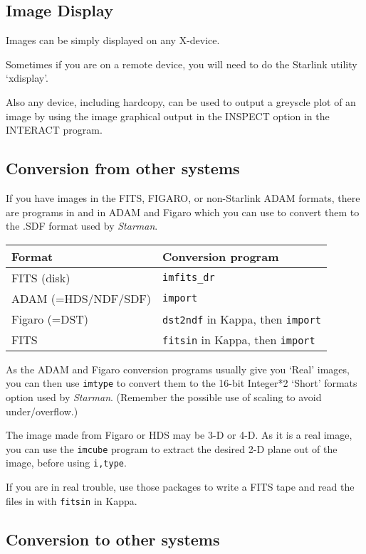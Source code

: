 \subsection{Image Display}

Images can be simply displayed on any X-device.

Sometimes if you are on a remote device, you will need to do the
Starlink utility `xdisplay'.

Also any device, including hardcopy, can be used to output a greyscle
plot of an image  by using the image graphical output in the INSPECT
option in the INTERACT program.


\subsection{Conversion from other systems}

If you have images in the FITS, FIGARO, or non-Starlink ADAM formats,
there are programs in \starman and in ADAM and Figaro which you can use
to convert them to the .SDF format used by {\it Starman}.

\hspace{4ex} \begin{tabular}[c]{|l|l|} \hline
   Format              &   Conversion program \\ \hline FITS
   (disk)         &   \verb|imfits_dr| \\ ADAM (=HDS/NDF/SDF) &
   \verb|import| \\ Figaro (=DST)       &   \verb|dst2ndf| in Kappa,
   then \verb|import| \\ FITS                &   \verb|fitsin| in
   Kappa, then \verb|import| \\ \hline \end{tabular}

As the ADAM and Figaro conversion programs usually give you `Real'
images, you can then use \verb|imtype| to convert them to the 16-bit
Integer*2 `Short' formats option used by {\it Starman}. (Remember the
possible use of scaling to avoid under/overflow.)

The image made from Figaro or HDS may be 3-D or 4-D. As it is a real
image, you can use the \verb|imcube| program to extract the desired 2-D
plane out of the image, before using \verb|i,type|.

If you are in real trouble, use those packages to write a FITS tape and
read the files in with \verb|fitsin| in Kappa.

\subsection{Conversion to other systems}

